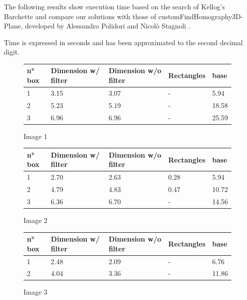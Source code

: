 \documentclass{article}
\begin{document}
The following results show execution time based on the search of Kellog's Barchette and compare our solutions with those of customFindHomography3D-Plane, developed by Alessandro Polidori and Nicolò Stagnoli \cite{polidori_stagnoli_2022}.

Time is expressed in seconds and has been approximated to the second decimal digit.\\

\begin{figure}[H]
    \centering
    \begin{tabularx}{\textwidth}{||X X X X X||} 
        \hline
     n° box & Dimension w/ filter & Dimension w/o filter & Rectangles & base \\ [0.5ex]
     \hline\hline
     1 & 3.15 & 3.07 & - & 5.94 \\ 
     \hline
     2 & 5.23 & 5.19 & - & 18.58 \\
     \hline
     3 & 6.96 & 6.96 & - & 25.59 \\
     \hline
    \end{tabularx}
    \caption{Image 1}
    \label{imag1}
\end{figure}

\begin{figure}[H]
    \centering
   \begin{tabularx}{\textwidth}{||X X X X X||} 
        \hline
     n° box & Dimension w/ filter & Dimension w/o filter & Rectangles & base \\ [0.5ex]
     \hline\hline
     1 & 2.70 & 2.63 & 0.28 & 5.94 \\ 
     \hline
     2 & 4.79 & 4.83 & 0.47 & 10.72 \\
     \hline
     3 & 6.36 & 6.70 & - & 14.56 \\
     \hline
    \end{tabularx}
     \caption{Image 2}
\end{figure}

\begin{figure}[H]
    \centering
  \begin{tabularx}{\textwidth}{||X X X X X||} 
        \hline
     n° box & Dimension w/ filter & Dimension w/o filter & Rectangles & base \\ [0.5ex]
     \hline\hline
     1 & 2.48 & 2.09 & - & 6.76 \\ 
     \hline
     2 & 4.04 & 3.36 & - & 11.86 \\
     \hline
    \end{tabularx}
     \caption{Image 3}
\end{figure}
\end{document}
